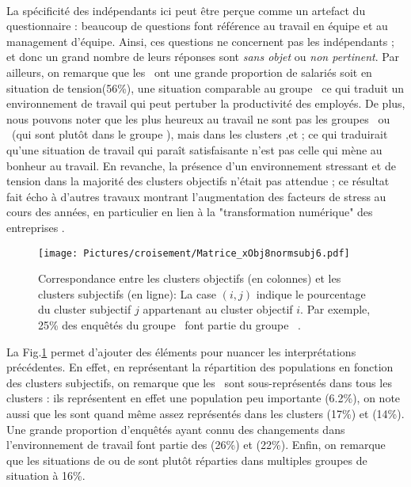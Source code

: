 \documentclass[11pt,fleqn,openany,frenchb]{book} %
\begin{document}
\paragraph{}
La spécificité des indépendants ici peut être perçue comme un artefact du questionnaire : beaucoup de questions font référence au travail en équipe et au management d'équipe. Ainsi, ces questions ne concernent pas les indépendants ; et donc un grand nombre de leurs réponses sont {\em sans objet} ou {\em non pertinent}. Par ailleurs, on remarque que les \ACC\ ont une grande proportion de salariés soit en situation de tension(56\%), une situation comparable au groupe \SANTE\, ce qui traduit un environnement de travail qui peut pertuber la productivité des employés. De plus, nous pouvons noter que les plus heureux au travail ne sont pas les groupes \CSPPPr\ ou \CSPPPu\ (qui sont plutôt dans le groupe \RAS), mais dans les clusters \SERV,\IMM et \OUVR ; ce qui traduirait qu'une situation de travail qui paraît satisfaisante n'est pas celle qui mène au bonheur au travail. En revanche, la présence d'un environnement stressant et de tension dans la majorité des clusters objectifs n'était pas attendue ;  ce résultat fait écho à d'autres travaux montrant l'augmentation des facteurs de stress au cours des années, en particulier en lien à la "transformation numérique" des entreprises \cite{datchary2011dispersion}. 


\begin{figure}[!h]
\center
\texttt{[image: Pictures/croisement/Matrice\_xObj8normsubj6.pdf]}
\caption{Correspondance entre les clusters objectifs (en colonnes) et les clusters subjectifs (en ligne): La case $(i,j)$ indique le pourcentage du cluster subjectif $j$ appartenant au cluster objectif $i$. Par exemple, 25\% des enquêtés du groupe \GLOB\ font partie du groupe \CSPPPr\ .}
\label{fig:objxnormsubj}
\end{figure} %

La Fig.\ref{fig:objxnormsubj} permet d'ajouter des éléments pour nuancer les interprétations précédentes. En effet, en représentant la répartition des populations en fonction des clusters subjectifs, on remarque que les \IMM\ sont sous-représentés dans tous les clusters : ils représentent en effet une population peu importante (6.2\%), on note aussi que les \HEUR sont quand même assez représentés dans les clusters \CSPPPr (17\%) et \CSPPPu (14\%). Une grande proportion d'enquêtés ayant connu des changements dans l'environnement de travail font partie des \CSPPPr (26\%) et \CSPPPu (22\%). Enfin, on remarque que les situations de \MALH ou de \GLOB sont plutôt réparties dans multiples groupes de situation à 16\%.
\end{document}
